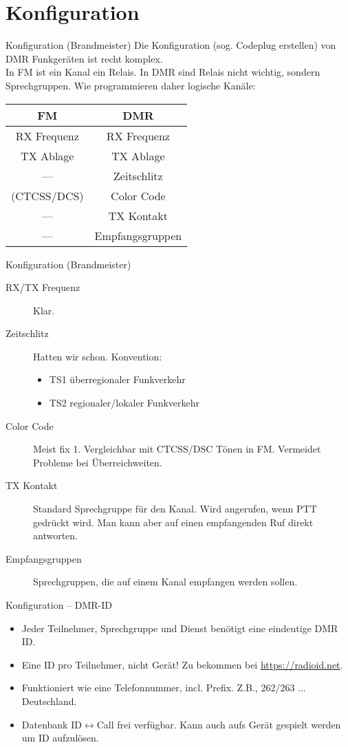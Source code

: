 \documentclass[aspectratio=169]{beamer}
\begin{document}
\section{Konfiguration}
\begin{frame}{Konfiguration (Brandmeister)}
Die Konfiguration (sog. Codeplug erstellen) von DMR Funkgeräten ist recht komplex. \\[0.5cm]

\pause In FM ist ein Kanal ein Relais. In DMR sind Relais nicht wichtig, sondern Sprechgruppen. Wie programmieren daher logische Kanäle:
\begin{center}
\begin{tabular}{|c|c|} \hline
FM & DMR \\ \hline \hline
RX Frequenz & RX Frequenz \\
TX Ablage & TX Ablage \\
 --- & Zeitschlitz \\
(CTCSS/DCS) & Color Code \\
--- & TX Kontakt \\
--- & Empfangsgruppen \\\hline
\end{tabular}
\end{center}
\end{frame}

\begin{frame}{Konfiguration (Brandmeister)}
\begin{description}
 \item[RX/TX Frequenz] Klar.
 \item[Zeitschlitz] Hatten wir schon. Konvention: 
 \begin{itemize}
  \item TS1 überregionaler Funkverkehr
  \item TS2 regionaler/lokaler Funkverkehr
 \end{itemize}
 \item[Color Code] Meist fix 1. Vergleichbar mit CTCSS/DSC Tönen in FM. Vermeidet Probleme bei Überreichweiten.
 \item[TX Kontakt] Standard Sprechgruppe für den Kanal. Wird angerufen, wenn PTT gedrückt wird. Man kann aber auf einen empfangenden Ruf direkt antworten. 
 \item[Empfangsgruppen] Sprechgruppen, die auf einem Kanal empfangen werden sollen.
\end{description}
\end{frame}

\begin{frame}{Konfiguration -- DMR-ID}
 \begin{itemize}
  \item Jeder Teilnehmer, Sprechgruppe und Dienst benötigt eine eindeutige DMR ID. 
  \item Eine ID pro Teilnehmer, nicht Gerät! Zu bekommen bei \url{https://radioid.net}.
  \item Funktioniert wie eine Telefonnummer, incl. Prefix. Z.B., 262/263 ... Deutschland.
  \item Datenbank ID$\leftrightarrow$Call frei verfügbar. Kann auch aufs Gerät gespielt werden um ID aufzulösen.
 \end{itemize}
\end{frame}
\end{document}
